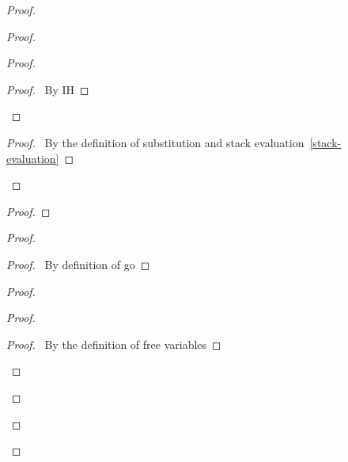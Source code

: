 \documentclass[a4paper]{article}
\begin{document}
\begin{proof}
\begin{proof}
\begin{proof}
      \qedstep
      \begin{proof}
        \pf\ By IH
      \end{proof}
    \end{proof}
    \begin{proof}
      \pf\ By the definition of substitution and stack evaluation~\ref{stack-evaluation}
    \end{proof}
  \end{proof}
  \begin{proof}
  \end{proof}
  \begin{proof}
    \begin{proof}
      \pf\ By definition of \textsf{go}
    \end{proof}
     \label{pf:6-2}
    \begin{proof}
      \begin{proof}
        \begin{proof}
          \pf\ By the definition of free variables
        \end{proof}

\end{proof}
\end{proof}
\end{proof}
\end{proof}
\end{document}
